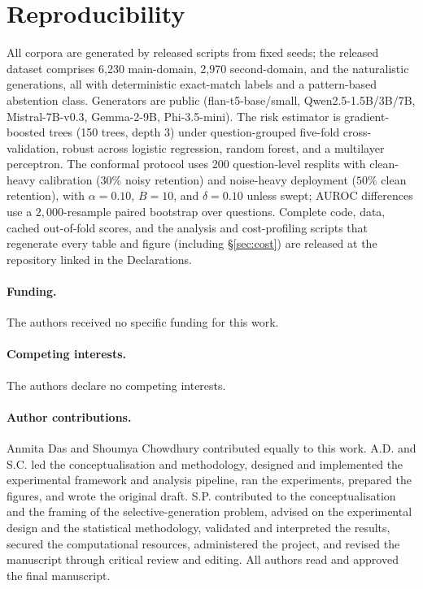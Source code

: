 \documentclass[sn-basic]{sn-jnl}
\theoremstyle{thmstyleone}
\theoremstyle{thmstyletwo}
\begin{document}
\appendix

\section{Reproducibility}\label{app:repro}
All corpora are generated by released scripts from fixed seeds; the released
dataset comprises 6{,}230 main-domain, 2{,}970 second-domain, and the
naturalistic generations, all with deterministic exact-match labels and a
pattern-based abstention class. Generators are public (flan-t5-base/small,
Qwen2.5-1.5B/3B/7B, Mistral-7B-v0.3, Gemma-2-9B, Phi-3.5-mini). The risk
estimator is gradient-boosted trees (150 trees, depth 3) under
question-grouped five-fold cross-validation, robust across logistic
regression, random forest, and a multilayer perceptron. The conformal
protocol uses 200 question-level resplits with clean-heavy calibration
($30\%$ noisy retention) and noise-heavy deployment ($50\%$ clean
retention), with $\alpha = 0.10$, $B = 10$, and $\delta = 0.10$ unless
swept; AUROC differences use a $2{,}000$-resample paired bootstrap over
questions. Complete code, data, cached out-of-fold scores, and the analysis
and cost-profiling scripts that regenerate every table and figure
(including \S\ref{sec:cost}) are released at the repository linked
in the Declarations.

\backmatter

\paragraph{Funding.} The authors received no specific funding for this work.

\paragraph{Competing interests.} The authors declare no competing interests.

\paragraph{Author contributions.} Anmita Das and Shoumya Chowdhury
contributed equally to this work. A.D. and S.C. led the conceptualisation
and methodology, designed and implemented the experimental framework and
analysis pipeline, ran the experiments, prepared the figures, and wrote the
original draft. S.P. contributed to the conceptualisation and the framing of
the selective-generation problem, advised on the experimental design and the
statistical methodology, validated and interpreted the results, secured the
computational resources, administered the project, and revised the manuscript
through critical review and editing. All authors read and approved the final
manuscript.
\end{document}
